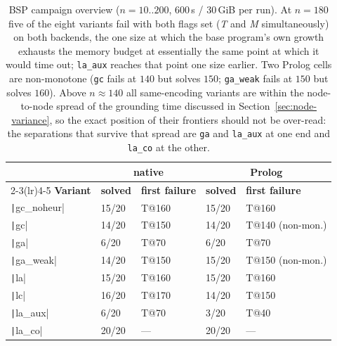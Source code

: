 \begin{table}[H]
\centering
\small
\begin{tabular}{lllll}
\toprule
 & \multicolumn{2}{c}{\textbf{native}} & \multicolumn{2}{c}{\textbf{Prolog}}\\
\cmidrule(lr){2-3}\cmidrule(lr){4-5}
\textbf{Variant} & \textbf{solved} & \textbf{first failure} & \textbf{solved} & \textbf{first failure}\\
\midrule
\texttt|gc_noheur| & 15/20 & T@160 & 15/20 & T@160\\
\texttt|gc|        & 14/20 & T@150 & 14/20 & T@140 (non-mon.)\\
\texttt|ga|        & 6/20  & T@70  & 6/20  & T@70\\
\texttt|ga_weak|   & 14/20 & T@150 & 15/20 & T@150 (non-mon.)\\
\texttt|la|        & 15/20 & T@160 & 15/20 & T@160\\
\texttt|lc|        & 16/20 & T@170 & 14/20 & T@150\\
\texttt|la_aux|    & 6/20  & T@70 & 3/20 & T@40\\
\texttt|la_co|     & 20/20 & --- & 20/20 & ---\\
\bottomrule
\end{tabular}
\caption{BSP campaign overview ($n=10..200$, 600\,s / 30\,GiB per run). At $n=180$ five of the eight variants fail with both flags set (\emph{T} and \emph{M} simultaneously) on both backends, the one size at which the base program's own growth exhausts the memory budget at essentially the same point at which it would time out; \texttt{la\_aux} reaches that point one size earlier. Two Prolog cells are non-monotone (\texttt{gc} fails at $140$ but solves $150$; \texttt{ga\_weak} fails at $150$ but solves $160$). Above $n \approx 140$ all same-encoding variants are within the node-to-node spread of the grounding time discussed in Section~\ref{sec:node-variance}, so the exact position of their frontiers should not be over-read: the separations that survive that spread are \texttt{ga} and \texttt{la\_aux} at one end and \texttt{la\_co} at the other.}
\label{tab:overview-bsp}
\end{table}

